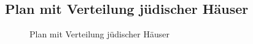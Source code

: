 \documentclass[
  letterpaper,
  DIV=11,
  numbers=noendperiod,
  landscape,
  a4paper,
  geometry:margin=1in]{scrartcl}
\begin{document}
\subsection{Plan mit Verteilung jüdischer
Häuser}\label{plan-mit-verteilung-juxfcdischer-huxe4user}

\begin{figure}


\caption{\label{fig-plan-mit-verteilung-juedischer-haeuser}Plan mit
Verteilung jüdischer Häuser}

\end{figure}%
\end{document}
